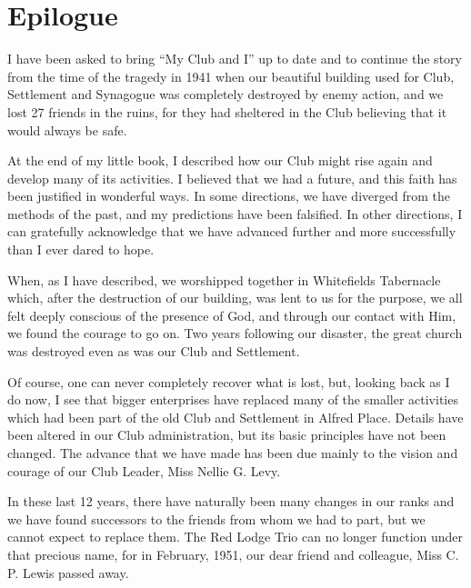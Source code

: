 \chapter{Epilogue}

I have been asked to bring “My Club and I” up to date
and to continue the story from the time of the tragedy in
1941 when our beautiful building used for Club, Settlement
and Synagogue was completely destroyed by enemy
action, and we lost 27 friends in the ruins, for they had
sheltered in the Club believing that it would always
be safe.

At the end of my little book, I described how our Club
might rise again and develop many of its activities. I
believed that we had a future, and this faith has been
justified in wonderful ways. In some directions, we have
diverged from the methods of the past, and my predictions have been falsified. In other directions, I can
gratefully acknowledge that we have advanced further
and more successfully than I ever dared to hope.

When, as I have described, we worshipped together
in Whitefields Tabernacle which, after the destruction of
our building, was lent to us for the purpose, we all felt
deeply conscious of the presence of God, and through
our contact with Him, we found the courage to go on.
Two years following our disaster, the great church was
destroyed even as was our Club and Settlement.

Of course, one can never completely recover what is
lost, but, looking back as I do now, I see that bigger
enterprises have replaced many of the smaller activities
which had been part of the old Club and Settlement in
Alfred Place. Details have been altered in our Club
administration, but its basic principles have not been
changed. The advance that we have made has been due
mainly to the vision and courage of our Club Leader,
Miss Nellie G. Levy.

In these last 12 years, there have naturally been many
changes in our ranks and we have found successors to
the friends from whom we had to part, but we cannot
expect to replace them. The Red Lodge Trio can no
longer function under that precious name, for in
February, 1951, our dear friend and colleague, Miss C.
P. Lewis passed away.

